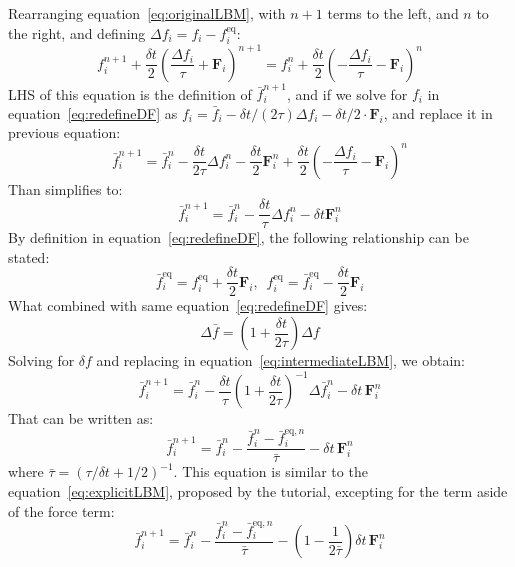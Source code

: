 \documentclass{article}
\begin{document}
	Rearranging equation~\ref{eq:originalLBM}, with $n+1$ terms to the left, and $n$ to the right, and defining $\Delta f_i=f_i - f^{\text{eq}}_i$:
	\begin{equation*}
		f^{n+1}_i + \frac{\delta t}{2} \left( \frac{\Delta f_i}{\tau} + \mathbf{F}_i \right)^{n+1} = f^{n}_i + \frac{\delta t}{2} \left( - \frac{\Delta f_i}{\tau} - \mathbf{F}_i \right)^{n}
	\end{equation*}
	LHS of this equation is the definition of $\bar{f}^{n+1}_i$, and if we solve for $f_i$ in equation~\ref{eq:redefineDF} as $f_i = \bar{f}_i - \delta t /(2\tau) \Delta f_i - \delta t/2 \cdot \mathbf{F}_i$, and replace it in previous equation:
	\begin{equation*}
		\bar{f}^{n+1}_i = \bar{f}^{n}_i - \frac{\delta t}{2\tau} \Delta f^n_i - \frac{\delta t}{2} \mathbf{F}^n_i + \frac{\delta t}{2} \left( - \frac{\Delta f_i}{\tau} - \mathbf{F}_i \right)^{n}
	\end{equation*}
	Than simplifies to:
	\begin{equation*}\label{eq:intermediateLBM}
		\bar{f}^{n+1}_i = \bar{f}^{n}_i - \frac{\delta t}{\tau} \Delta f^n_i - \delta t \mathbf{F}^n_i
	\end{equation*}
	By definition in equation~\ref{eq:redefineDF}, the following relationship can be stated:
	\begin{equation*}
		\bar{f}^{\text{eq}}_i = f^{\text{eq}}_i+\frac{\delta t}{2} \mathbf{F}_i, \, \, \, f^{\text{eq}}_i = \bar{f}^{\text{eq}}_i -\frac{\delta t}{2} \mathbf{F}_i
	\end{equation*}
	What combined with same equation~\ref{eq:redefineDF} gives:
	\begin{equation*}
		\Delta \bar{f} = \left(1 + \frac{\delta t}{2\tau}\right) \Delta f
	\end{equation*}
	Solving for $\delta f$ and replacing in equation~\ref{eq:intermediateLBM}, we obtain:
	\begin{equation*}
		\bar{f}^{n+1}_i = \bar{f}^{n}_i - \frac{\delta t}{\tau} \left(1+\frac{\delta t}{2\tau}\right)^{-1} \Delta \bar{f}^n_i - \delta t \, \mathbf{F}^n_i
	\end{equation*} 
	That can be written as:
	\begin{equation}
		\bar{f}^{n+1}_i = \bar{f}^{n}_i - \frac{\bar{f}^{n}_i - \bar{f}^{\text{eq},n}_i }{\bar{\tau}} - \delta t \, \mathbf{F}^n_i
	\end{equation}
	where $\bar{\tau} = (\tau/{\delta t}+1/2)^{-1}$. This equation is similar to the equation~\ref{eq:explicitLBM}, proposed by the tutorial, excepting for the term aside of the force term:
	\begin{equation}\label{eq:explicitLBM}
		\bar{f}^{n+1}_i  = \bar{f}^{n}_i - \frac{\bar{f}^{n}_i - \bar{f}^{\text{eq},n}_i }{\bar{\tau}} - \left( 1 - \frac{1}{2\bar{\tau}} \right) \delta t \, \mathbf{F}^{n}_i 
	\end{equation}
\end{document}

